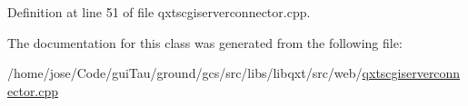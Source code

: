 Definition at line 51 of file qxtscgiserverconnector.\-cpp.



The documentation for this class was generated from the following file\-:\begin{DoxyCompactItemize}
\item 
/home/jose/\-Code/gui\-Tau/ground/gcs/src/libs/libqxt/src/web/\hyperlink{qxtscgiserverconnector_8cpp}{qxtscgiserverconnector.\-cpp}\end{DoxyCompactItemize}
